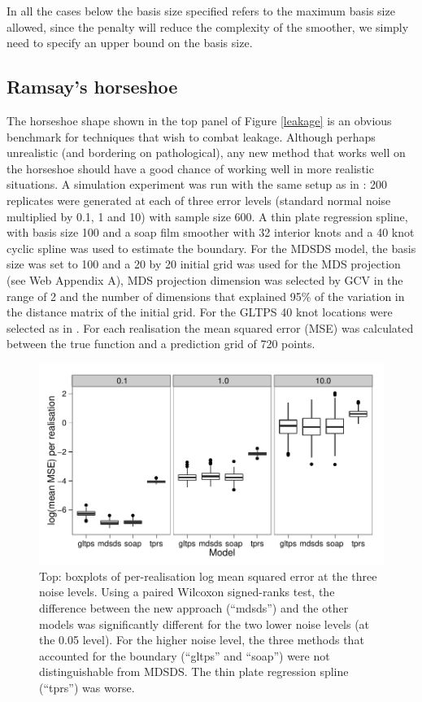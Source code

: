 \documentclass[smallextended]{svjour3}       %
\begin{document}
In all the cases below the basis size specified refers to the maximum basis size allowed, since the penalty will reduce the complexity of the smoother, we simply need to specify an upper bound on the basis size.


\subsection{Ramsay's horseshoe}

The horseshoe shape shown in the top panel of Figure \ref{leakage} is an obvious benchmark for techniques that wish to combat leakage. Although perhaps unrealistic (and bordering on pathological), any new method that works well on the horseshoe should have a good chance of working well in more realistic situations. A simulation experiment was run with the same setup as in \cite{Wood:2008vo}: 200 replicates were generated at each of three error levels (standard normal noise multiplied by 0.1, 1 and 10) with sample size 600. A thin plate regression spline, with basis size 100 and a soap film smoother with 32 interior knots  and a 40 knot cyclic  spline was used to estimate the boundary. For the MDSDS model, the basis size was set to 100 and a 20 by 20 initial grid was used for the MDS projection (see Web Appendix A), MDS projection dimension was selected by GCV in the range of 2 and the number of dimensions that explained 95\% of the variation in the distance matrix of the initial grid. For the GLTPS 40 knot locations were selected as in \cite{Wang:2007tf}. For each realisation the mean squared error (MSE) was calculated between the true function and a prediction grid of 720 points.

\begin{figure}
\centering
\includegraphics[width=\textwidth]{examples/ramsay/ramsay-result.pdf}
\caption{Top: boxplots of per-realisation log mean squared error at the three noise levels. Using a paired Wilcoxon signed-ranks test, the difference between the new approach (``mdsds'') and the other models was significantly different for the two lower noise levels (at the 0.05 level). For the higher noise level, the three methods that accounted for the boundary (``gltps'' and ``soap'') were not distinguishable from MDSDS. The thin plate regression spline (``tprs'') was worse.
\label{ramsay-results}}
\end{figure}
\end{document}
